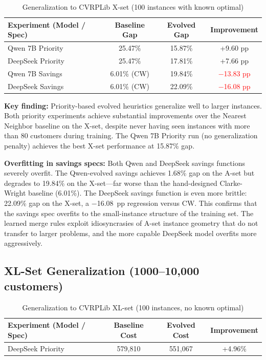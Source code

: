 \documentclass{article}
\begin{document}
\begin{table}[h]
\centering
\small
\caption{Generalization to CVRPLib X-set (100 instances with known optimal)}
\label{tab:xset}
\vspace{-4pt}
\begin{tabular}{lccc}
\toprule
Experiment (Model / Spec) & Baseline Gap & Evolved Gap & Improvement \\
\midrule
Qwen 7B Priority & 25.47\% & 15.87\% & +9.60 pp \\
DeepSeek Priority & 25.47\% & 17.81\% & +7.66 pp \\
Qwen 7B Savings & 6.01\% (CW) & 19.84\% & \textcolor{red}{$-$13.83 pp} \\
DeepSeek Savings & 6.01\% (CW) & 22.09\% & \textcolor{red}{$-$16.08 pp} \\
\bottomrule
\end{tabular}
\vspace{-4pt}
\end{table}

\textbf{Key finding:} Priority-based evolved heuristics generalize well to larger instances. Both priority experiments achieve substantial improvements over the Nearest Neighbor baseline on the X-set, despite never having seen instances with more than 80 customers during training. The Qwen 7B Priority run (no generalization penalty) achieves the best X-set performance at 15.87\% gap.

\textbf{Overfitting in savings specs:} Both Qwen and DeepSeek savings functions severely overfit. The Qwen-evolved savings achieves 1.68\% gap on the A-set but degrades to 19.84\% on the X-set---far worse than the hand-designed Clarke-Wright baseline (6.01\%). The DeepSeek savings function is even more brittle: 22.09\% gap on the X-set, a $-$16.08~pp regression versus CW. This confirms that the savings spec overfits to the small-instance structure of the training set. The learned merge rules exploit idiosyncrasies of A-set instance geometry that do not transfer to larger problems, and the more capable DeepSeek model overfits more aggressively.

\subsection{XL-Set Generalization (1000--10,000 customers)}

\begin{table}[h]
\centering
\small
\caption{Generalization to CVRPLib XL-set (100 instances, no known optimal)}
\label{tab:xlset}
\vspace{-4pt}
\begin{tabular}{lccc}
\toprule
Experiment (Model / Spec) & Baseline Cost & Evolved Cost & Improvement \\
\midrule
DeepSeek Priority & 579,810 & 551,067 & +4.96\% \\
\bottomrule
\end{tabular}
\vspace{-4pt}
\end{table}
\end{document}
